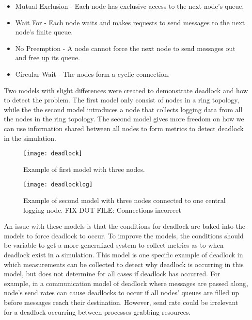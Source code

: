 \documentclass{article}
\begin{document}
\begin{itemize}
	\item Mutual Exclusion - Each node has exclusive access to the next node's queue.
	\item Wait For - Each node waits and makes requests to send messages to the next node's finite queue.
	\item No Preemption - A node cannot force the next node to send messages out and free up its queue.
	\item Circular Wait - The nodes form a cyclic connection.
\end{itemize}

Two models with slight differences were created to demonstrate deadlock and how to detect the problem. The first model only consist of nodes in a ring topology, while the the second model introduces a node that collects logging data from all the nodes in the ring topology. The second model gives more freedom on how we can use information shared between all nodes to form metrics to detect deadlock in the simulation.

\begin{figure}[H]
	\texttt{[image: deadlock]}\newline
	\centering
	\caption{Example of first model with three nodes.}
	\centering
\end{figure}

\begin{figure}[H]
	\texttt{[image: deadlocklog]}\newline
	\centering
	\caption{Example of second model with three nodes connected to one central logging node. FIX DOT FILE: Connections incorrect}
	\centering
\end{figure}

An issue with these models is that the conditions for deadlock are baked into the models to force deadlock to occur. To improve the models, the conditions should be variable to get a more generalized system to collect metrics as to when deadlock exist in a simulation. This model is one specific example of deadlock in which measurements can be collected to detect why deadlock is occurring in this model, but does not determine for all cases if deadlock has occurred. For example, in a communication model of deadlock where messages are passed along, node's send rates can cause deadlocks to occur if all nodes' queues are filled up before messages reach their destination. However, send rate could be irrelevant for a deadlock occurring between processes grabbing resources. 
\end{document}

